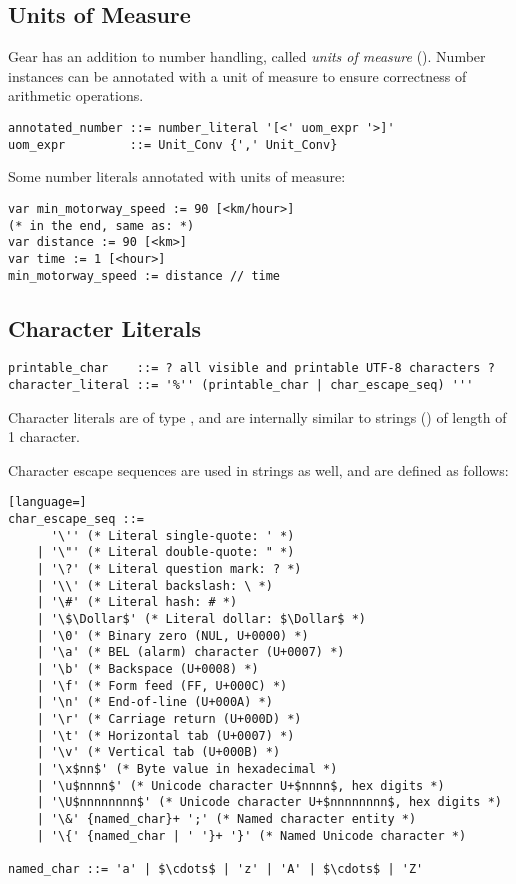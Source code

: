 \subsection{Units of Measure}
\label{sec:unitsofmeasuresyntax}

Gear has an addition to number handling, called {\em units of measure} (). Number instances can be annotated with a unit of measure to ensure correctness of arithmetic operations. 

\syntax\begin{lstlisting}
annotated_number ::= number_literal '[<' uom_expr '>]'
uom_expr         ::= Unit_Conv {',' Unit_Conv}
\end{lstlisting}

\example Some number literals annotated with units of measure:
\begin{lstlisting}
var min_motorway_speed := 90 [<km/hour>]
(* in the end, same as: *)
var distance := 90 [<km>]
var time := 1 [<hour>]
min_motorway_speed := distance // time
\end{lstlisting}






\subsection{Character Literals}
\label{sec:characterliterals}

\syntax\begin{lstlisting}
printable_char    ::= ? all visible and printable UTF-8 characters ? 
character_literal ::= '%'' (printable_char | char_escape_seq) '''
\end{lstlisting}

Character literals are of type , and are internally similar to strings () of length of 1 character. 

Character escape sequences are used in strings as well, and are defined as follows: 

\syntax\begin{lstlisting}[language=]
char_escape_seq ::= 
      '\'' (* Literal single-quote: ' *)
    | '\"' (* Literal double-quote: " *)
    | '\?' (* Literal question mark: ? *)
    | '\\' (* Literal backslash: \ *)
    | '\#' (* Literal hash: # *)
    | '\$\Dollar$' (* Literal dollar: $\Dollar$ *)
    | '\0' (* Binary zero (NUL, U+0000) *)
    | '\a' (* BEL (alarm) character (U+0007) *)
    | '\b' (* Backspace (U+0008) *)
    | '\f' (* Form feed (FF, U+000C) *)
    | '\n' (* End-of-line (U+000A) *)
    | '\r' (* Carriage return (U+000D) *)
    | '\t' (* Horizontal tab (U+0007) *)
    | '\v' (* Vertical tab (U+000B) *)
    | '\x$nn$' (* Byte value in hexadecimal *)
    | '\u$nnnn$' (* Unicode character U+$nnnn$, hex digits *)
    | '\U$nnnnnnnn$' (* Unicode character U+$nnnnnnnn$, hex digits *)
    | '\&' {named_char}+ ';' (* Named character entity *)
    | '\{' {named_char | ' '}+ '}' (* Named Unicode character *)
      
named_char ::= 'a' | $\cdots$ | 'z' | 'A' | $\cdots$ | 'Z'
\end{lstlisting}

